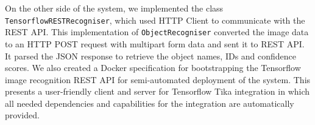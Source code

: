 
On the other side of the system, we implemented the class \texttt{TensorflowRESTRecogniser}, which used HTTP Client to communicate with the REST API. This implementation of \texttt{ObjectRecogniser} converted the image data to an HTTP POST request with multipart form data and sent it to REST API. It parsed the JSON response to retrieve the object names, IDs and confidence scores. We also created a Docker specification for bootstrapping the Tensorflow image recognition REST API for semi-automated deployment of the system. This presents a user-friendly client and server for Tensorflow Tika integration in which all needed dependencies and capabilities for the integration are automatically provided.

